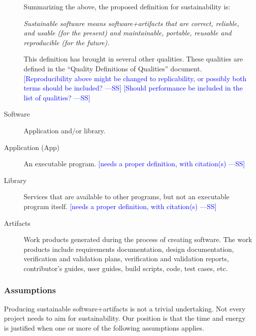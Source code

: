 \documentclass[12pt]{article}
\newcommand{\authornote}[3]{\textcolor{#1}{[#3 ---#2]}}
\newcommand{\authornote}[3]{}
\newcommand{\wss}[1]{\authornote{blue}{SS}{#1}} %
\begin{document}
\begin{description}
  Summarizing the above, the proposed definition for sustainability is:

  \emph{Sustainable software means software+artifacts that are correct,
    reliable, and usable (for the present) and maintainable, portable, reusable
    and reproducible (for the future).}

This definition has brought in several other qualities.  These qualities are
defined in the ``Quality  Definitions of Qualities'' document.
\wss{Reproducibility above might be changed to replicability, or possibly both
  terms should be included?}
\wss{Should performance be included in the list of qualities?}

\item[Software] Application and/or library.
\item[Application (App)] An executable program. \wss{needs a
    proper definition, with citation(s)}
\item[Library] Services that are available to other programs, but not an
  executable program itself. \wss{needs a
    proper definition, with citation(s)}
\item[Artifacts] Work products generated during the process of creating
  software.  The work products include requirements documentation, design
  documentation, verification and validation plans, verification and validation
  reports, contributor's guides, user guides, build scripts, code, test cases,
  etc.
\end{description}

\subsubsection*{Assumptions}

Producing sustainable software+artifacts is not a trivial undertaking.  Not
every project needs to aim for sustainability.  Our position is that the time
and energy is justified when one or more of the following assumptions applies.
\end{document}
